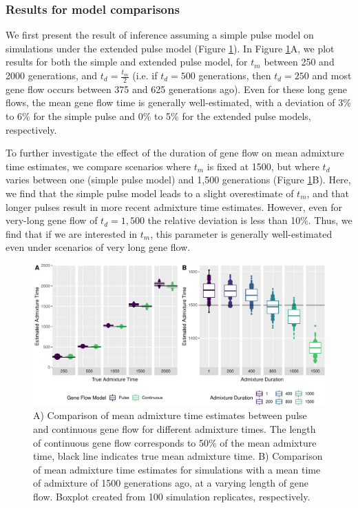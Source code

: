 \documentclass[]{article}
\begin{document}
\subsubsection{Results for model comparisons}
We first present the result of inference assuming a simple pulse model on simulations under the extended pulse model (Figure \ref{fig:fig2}).
In Figure \ref{fig:fig2}A, we plot results for both the simple and extended pulse model, for $t_m$ between 250 and 2000 generations, and $t_d = \frac{t_m}{2}$  (i.e. if $t_d= 500$ generations, then $t_d = 250$ and most gene flow occurs between  375 and 625
generations ago). Even for these long gene flows, the mean gene flow time is generally well-estimated, with a deviation of 3\% to 6\% for the simple pulse and 0\% to 5\% for
the extended pulse models, respectively.

To further investigate the effect of the duration of gene flow on mean
admixture time estimates, we compare scenarios where $t_m$ is fixed at 1500, but where $t_d$ varies between one (simple pulse model) and 1,500 generations (Figure \ref{fig:fig2}B). Here, we find that the simple pulse model leads to a slight overestimate of $t_m$, and that longer pulses result in more recent admixture time estimates. However, even  for very-long gene flow of $t_d=1,500$ the relative deviation is less than 10\%. Thus, we find that if we are interested in $t_m$, this parameter is generally well-estimated even under scenarios of very long gene flow.



\begin{figure}
\centering
\includegraphics{Admixture_Time_Inference_Paper_Draft_files/figure-latex/fig2-1.pdf}
\caption{\label{fig:fig2} A) Comparison of mean admixture time estimates
between pulse and continuous gene flow for different admixture times.
The length of continuous gene flow corresponds to 50\% of the mean
admixture time, black line indicates true mean admixture time. B)
Comparison of mean admixture time estimates for simulations with a mean
time of admixture of 1500 generations ago, at a varying length of gene
flow. Boxplot created from 100 simulation replicates, respectively.}
\end{figure}
\end{document}
